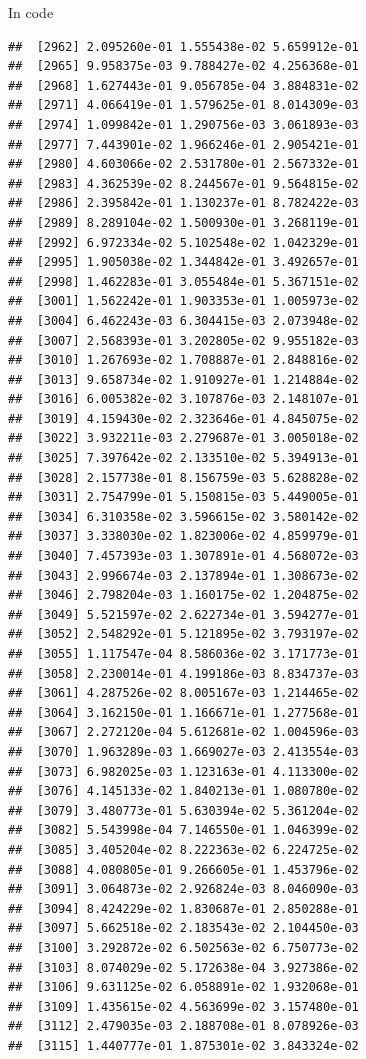 \documentclass[ignorenonframetext,]{beamer}
\begin{document}
\begin{frame}[fragile]{In code}
\begin{verbatim}
##  [2962] 2.095260e-01 1.555438e-02 5.659912e-01
##  [2965] 9.958375e-03 9.788427e-02 4.256368e-01
##  [2968] 1.627443e-01 9.056785e-04 3.884831e-02
##  [2971] 4.066419e-01 1.579625e-01 8.014309e-03
##  [2974] 1.099842e-01 1.290756e-03 3.061893e-03
##  [2977] 7.443901e-02 1.966246e-01 2.905421e-01
##  [2980] 4.603066e-02 2.531780e-01 2.567332e-01
##  [2983] 4.362539e-02 8.244567e-01 9.564815e-02
##  [2986] 2.395842e-01 1.130237e-01 8.782422e-03
##  [2989] 8.289104e-02 1.500930e-01 3.268119e-01
##  [2992] 6.972334e-02 5.102548e-02 1.042329e-01
##  [2995] 1.905038e-02 1.344842e-01 3.492657e-01
##  [2998] 1.462283e-01 3.055484e-01 5.367151e-02
##  [3001] 1.562242e-01 1.903353e-01 1.005973e-02
##  [3004] 6.462243e-03 6.304415e-03 2.073948e-02
##  [3007] 2.568393e-01 3.202805e-02 9.955182e-03
##  [3010] 1.267693e-02 1.708887e-01 2.848816e-02
##  [3013] 9.658734e-02 1.910927e-01 1.214884e-02
##  [3016] 6.005382e-02 3.107876e-03 2.148107e-01
##  [3019] 4.159430e-02 2.323646e-01 4.845075e-02
##  [3022] 3.932211e-03 2.279687e-01 3.005018e-02
##  [3025] 7.397642e-02 2.133510e-02 5.394913e-01
##  [3028] 2.157738e-01 8.156759e-03 5.628828e-02
##  [3031] 2.754799e-01 5.150815e-03 5.449005e-01
##  [3034] 6.310358e-02 3.596615e-02 3.580142e-02
##  [3037] 3.338030e-02 1.823006e-02 4.859979e-01
##  [3040] 7.457393e-03 1.307891e-01 4.568072e-03
##  [3043] 2.996674e-03 2.137894e-01 1.308673e-02
##  [3046] 2.798204e-03 1.160175e-02 1.204875e-02
##  [3049] 5.521597e-02 2.622734e-01 3.594277e-01
##  [3052] 2.548292e-01 5.121895e-02 3.793197e-02
##  [3055] 1.117547e-04 8.586036e-02 3.171773e-01
##  [3058] 2.230014e-01 4.199186e-03 8.834737e-03
##  [3061] 4.287526e-02 8.005167e-03 1.214465e-02
##  [3064] 3.162150e-01 1.166671e-01 1.277568e-01
##  [3067] 2.272120e-04 5.612681e-02 1.004596e-03
##  [3070] 1.963289e-03 1.669027e-03 2.413554e-03
##  [3073] 6.982025e-03 1.123163e-01 4.113300e-02
##  [3076] 4.145133e-02 1.840213e-01 1.080780e-02
##  [3079] 3.480773e-01 5.630394e-02 5.361204e-02
##  [3082] 5.543998e-04 7.146550e-01 1.046399e-02
##  [3085] 3.405204e-02 8.222363e-02 6.224725e-02
##  [3088] 4.080805e-01 9.266605e-01 1.453796e-02
##  [3091] 3.064873e-02 2.926824e-03 8.046090e-03
##  [3094] 8.424229e-02 1.830687e-01 2.850288e-01
##  [3097] 5.662518e-02 2.183543e-02 2.104450e-03
##  [3100] 3.292872e-02 6.502563e-02 6.750773e-02
##  [3103] 8.074029e-02 5.172638e-04 3.927386e-02
##  [3106] 9.631125e-02 6.058891e-02 1.932068e-01
##  [3109] 1.435615e-02 4.563699e-02 3.157480e-01
##  [3112] 2.479035e-03 2.188708e-01 8.078926e-03
##  [3115] 1.440777e-01 1.875301e-02 3.843324e-02

\end{verbatim}
\end{frame}
\end{document}
